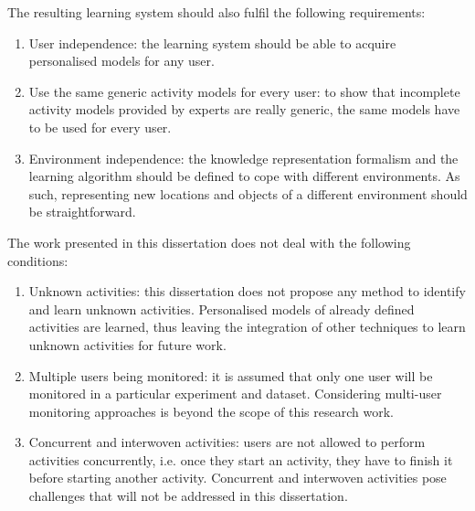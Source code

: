 The resulting learning system should also fulfil the following requirements:

\begin{enumerate}
 \item User independence: the learning system should be able to acquire personalised models for any user.
 \item Use the same generic activity models for every user: to show that incomplete activity models provided by experts are really generic, the same models have to be used for every user.
 \item Environment independence: the knowledge representation formalism and the learning algorithm should be defined to cope with different environments. As such, representing new locations and objects of a different environment should be straightforward.
\end{enumerate}


The work presented in this dissertation does not deal with the following conditions:

\begin{enumerate}
 \item Unknown activities: this dissertation does not propose any method to identify and learn unknown activities. Personalised models of already defined activities are learned, thus leaving the integration of other techniques to learn unknown activities for future work.
 \item Multiple users being monitored: it is assumed that only one user will be monitored in a particular experiment and dataset. Considering multi-user monitoring approaches is beyond the scope of this research work.
 \item Concurrent and interwoven activities: users are not allowed to perform activities concurrently, i.e. once they start an activity, they have to finish it before starting another activity. Concurrent and interwoven activities pose challenges that will not be addressed in this dissertation.
\end{enumerate}



